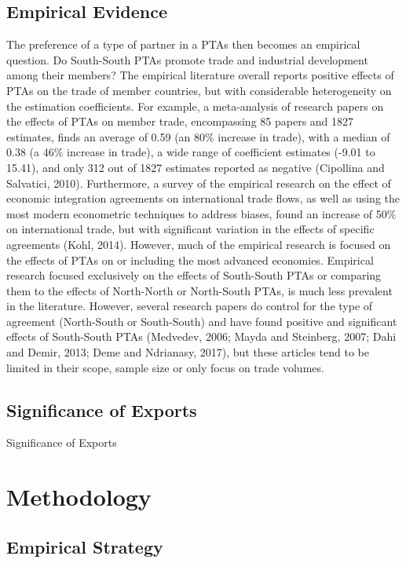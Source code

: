\documentclass[12pt]{article}%
\begin{document}
%
\subsection{Empirical Evidence}%
\label{subsec:EmpiricalEvidence}%

%
The preference of a type of partner in a PTAs then becomes an empirical
question. Do South-South PTAs promote trade and industrial development
among their members? The empirical literature overall reports positive
effects of PTAs on the trade of member countries, but with considerable
heterogeneity on the estimation coefficients. For example, a
meta-analysis of research papers on the effects of PTAs on member trade,
encompassing 85 papers and 1827 estimates, finds an average of 0.59 (an
80\% increase in trade), with a median of 0.38 (a 46\% increase in
trade), a wide range of coefficient estimates (-9.01 to 15.41), and only
312 out of 1827 estimates reported as negative (Cipollina and Salvatici,
2010). Furthermore, a survey of the empirical research on the effect of
economic integration agreements on international trade flows, as well as
using the most modern econometric techniques to address biases, found an
increase of 50\% on international trade, but with significant variation
in the effects of specific agreements (Kohl, 2014). However, much of the
empirical research is focused on the effects of PTAs on or including the
most advanced economies. Empirical research focused exclusively on the
effects of South-South PTAs or comparing them to the effects of
North-North or North-South PTAs, is much less prevalent in the
literature. However, several research papers do control for the type of
agreement (North-South or South-South) and have found positive and
significant effects of South-South PTAs (Medvedev, 2006; Mayda and
Steinberg, 2007; Dahi and Demir, 2013; Deme and Ndrianasy, 2017), but
these articles tend to be limited in their scope, sample size or only
focus on trade volumes.%
\subsection{Significance of Exports}%
\label{subsec:SignificanceofExports}%

%
Significance of Exports

%
\section{Methodology}%
\label{sec:Methodology}%
\subsection{Empirical Strategy}%
\label{subsec:EmpiricalStrategy}%
\end{document}
